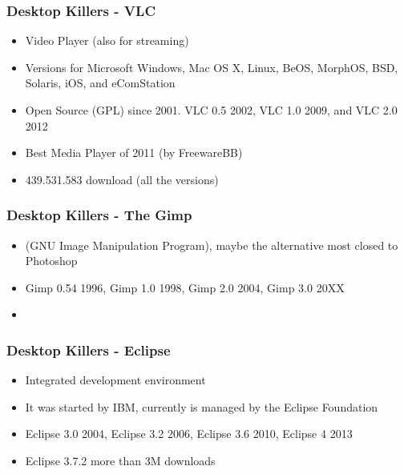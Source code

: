 \documentclass{beamer}
\begin{document}
\begin{frame}
\frametitle{Desktop Killers - VLC}


\begin{itemize}
\item Video Player (also for streaming)
\item Versions for Microsoft Windows, Mac OS X, Linux, BeOS, MorphOS, BSD, Solaris, iOS, and eComStation
\item Open Source (GPL) since 2001. VLC 0.5 2002, VLC 1.0 2009, and VLC 2.0 2012
\item Best Media Player of 2011  (by FreewareBB) 
\item 439.531.583 download (all the versions)
\end{itemize}

\end{frame}



\begin{frame}
\frametitle{Desktop Killers - The Gimp}

\begin{itemize}
\item (GNU Image Manipulation Program), maybe the alternative most closed to Photoshop
\item Gimp 0.54 1996, Gimp 1.0 1998, Gimp 2.0 2004, Gimp 3.0 20XX
\item 
	
\end{itemize}

\end{frame}




\begin{frame}
\frametitle{Desktop Killers - Eclipse}

\begin{itemize}
\item Integrated development environment 
\item It was started by IBM, currently is managed by the Eclipse Foundation
\item Eclipse 3.0 2004, Eclipse 3.2 2006, Eclipse 3.6 2010, Eclipse 4 2013
\item Eclipse 3.7.2 more than 3M downloads 
\end{itemize}

\end{frame}
\end{document}
